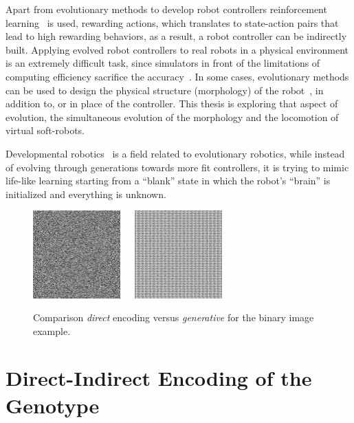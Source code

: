Apart from evolutionary methods to develop robot controllers reinforcement learning~\citep{hayes1994robot,mahadevan1992automatic} is used, rewarding actions, which translates to state-action pairs that lead to high rewarding behaviors, as a result, a robot controller can be indirectly built. Applying evolved robot controllers to real robots in a physical environment is an extremely difficult task, since simulators in front of the limitations of computing efficiency sacrifice the accuracy~\citep{jakobi1995noise}. In some cases, evolutionary methods can be used to design the physical structure (morphology) of the robot~\citep{hiller2010evolving}, in addition to, or in place of the controller. This thesis is exploring that aspect of evolution, the simultaneous evolution of the morphology and the locomotion of virtual soft-robots. 

Developmental robotics~\citep{lungarella2003developmental,asada2001cognitive,weng2004developmental,asada2009cognitive} is a field related to evolutionary robotics,  while instead of evolving through generations towards more fit controllers, it is trying to mimic life-like learning starting from a ``blank'' state in which the robot's ``brain'' is initialized and everything is unknown.

\begin{figure}[t!]
\centering
\includegraphics[width=0.3\textwidth]{../Figures/Misc/direct.jpg}\  \   \   
\includegraphics[width=0.3\textwidth]{../Figures/Misc/indirect.jpg}
\caption{Comparison \emph{direct} encoding versus \emph{generative} for the binary image example.}
\label{fig:directVsIndirectEncoding}
\end{figure}


\section{Direct-Indirect Encoding of the Genotype}
\label{DirectIndirect}

